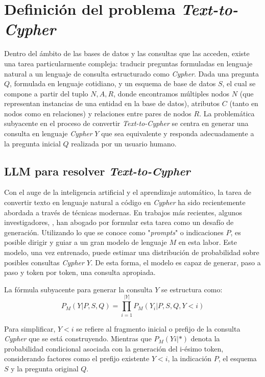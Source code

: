 \section{Definición del problema \textit{Text-to-Cypher}} \label{problem_definition}
Dentro del ámbito de las bases de datos y las consultas que las acceden, existe una tarea particularmente compleja: traducir preguntas formuladas en lenguaje natural a un lenguaje de consulta estructurado como \textit{Cypher}. Dada una pregunta $Q$, formulada en lenguaje cotidiano, y un esquema de base de datos $S$, el cual se compone a partir del tuplo ${N, A, R}$, donde encontramos múltiples nodos $N$ (que representan instancias de una entidad en la base de datos), atributos $C$ (tanto en nodos como en relaciones) y relaciones entre pares de nodos $R$. La problemática subyacente en el proceso de convertir \textit{Text-to-Cypher} se centra en generar una consulta en lenguaje \textit{Cypher} $Y$ que sea equivalente y responda adecuadamente a la pregunta inicial $Q$ realizada por un usuario humano.

\subsection{LLM para resolver \textit{Text-to-Cypher}} \label{llmfortext2cypher}

Con el auge de la inteligencia artificial y el aprendizaje automático, la tarea de convertir texto en lenguaje natural a código en \textit{Cypher} ha sido recientemente abordada a través de técnicas modernas. En trabajos más recientes, algunos investigadores, \cite{sunetal2023} \cite{liuetal2023}, han abogado por formular esta tarea como un desafío de generación. Utilizando lo que se conoce como "\textit{prompts}" o indicaciones $P$, es posible dirigir y guiar a un gran modelo de lenguaje $M$ en esta labor. Este modelo, una vez entrenado, puede estimar una distribución de probabilidad sobre posibles consultas \textit{Cypher} $Y$. De esta forma, el modelo es capaz de generar, paso a paso y token por token, una consulta apropiada.

La fórmula subyacente para generar la consulta $Y$ se estructura como:
$$P_M(Y|P, S, Q) = \prod_{i=1}^{|Y|}{P_M(Y_i | P, S, Q, Y < i)}$$ \label{llm_query_generation}

Para simplificar, $Y< i$ se refiere al fragmento inicial o prefijo de la consulta \textit{Cypher} que se está construyendo. Mientras que $P_M(Yi|*)$ denota la probabilidad condicional asociada con la generación del i-ésimo token, considerando factores como el prefijo existente $Y<i$, la indicación $P$, el esquema $S$ y la pregunta original $Q$.

